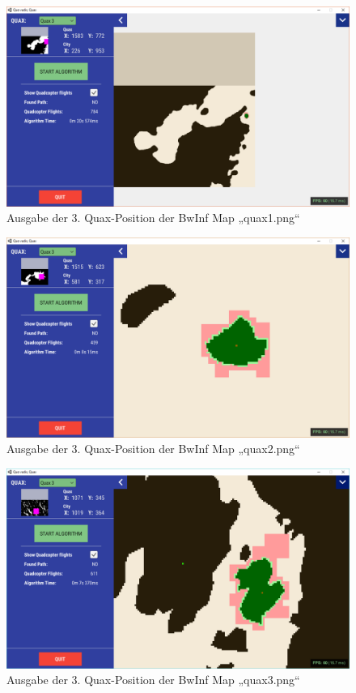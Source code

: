 \documentclass[a4paper,12pt]{article}
\begin{document}
\begin{figure}[H]
\centering
    \includegraphics[width=1\linewidth]{Bilder/Aufgabe3/quax1_03.png}
    \caption{Ausgabe der 3. Quax-Position der BwInf Map „quax1.png“}
\end{figure}
\begin{figure}[H]
\centering
    \includegraphics[width=1\linewidth]{Bilder/Aufgabe3/quax2_03.png}
    \caption{Ausgabe der 3. Quax-Position der BwInf Map „quax2.png“}
\end{figure}
\begin{figure}[H]
\centering
    \includegraphics[width=1\linewidth]{Bilder/Aufgabe3/quax3_03.png}
    \caption{Ausgabe der 3. Quax-Position der BwInf Map „quax3.png“}
\end{figure}
\end{document}

